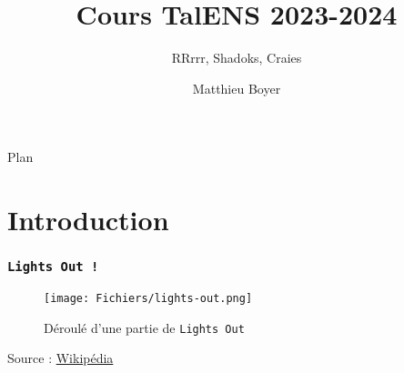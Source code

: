 \documentclass{beamercours}
\title{Cours TalENS 2023-2024}
\subtitle{RRrrr, Shadoks, Craies}
\author{Matthieu Boyer}
\begin{document}
\maketitle
\begin{frame}{Plan}\tableofcontents[sectionstyle=show]
\end{frame}
\section*{Introduction}
\begin{frame}
    \frametitle{\tt Lights Out !}
    \begin{figure}
        \texttt{[image: Fichiers/lights-out.png]}
        \caption{Déroulé d'une partie de \texttt{Lights Out}}
    \end{figure}
    Source : \href{https://upload.wikimedia.org/wikipedia/commons/thumb/a/a9/LightsOutIllustration.svg/400px-LightsOutIllustration.svg.png}{Wikipédia}\\

\end{frame}
\end{document}
